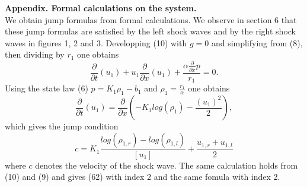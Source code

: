 \documentclass[a4paper,12pt]{article}
\begin{document}
\textbf{Appendix. Formal calculations on the system.}\\
 We obtain jump formulas from formal calculations. We observe in section 6 that these jump formulas are satisfied by the left shock waves and by the right shock waves in figures 1, 2 and 3. Developping (10) with $g=0$ and simplifying from (8), then dividing by $r_1$ one obtains\\
\begin{equation}\frac{\partial}{\partial t}(u_1)+u_1\frac{\partial}{\partial x}(u_1)+\frac{\alpha\frac{\partial}{\partial x} p}{r_1}=0.\end{equation}
Using the state law (6) $p=K_1\rho_1-b_1$ and $\rho_1=\frac{r_1}{\alpha}$ one obtains 
$$\frac{\partial}{\partial t} (u_1)=\frac{\partial}{\partial x}(-K_1log(\rho_1)-\frac{(u_1)^2}{2}),$$
which gives the jump condition
\begin{equation} c=K_1\frac{log(\rho_{1,r})-log(\rho_{1,l})}{[u_1]}+\frac{u_{1,r}+u_{1,l}}{2}
\end{equation}
where $c$ denotes the velocity of the shock wave. The same calculation holds from (10) and (9) and gives (62)  with index 2 and the same fomula with index 2.\\
\end{document}
